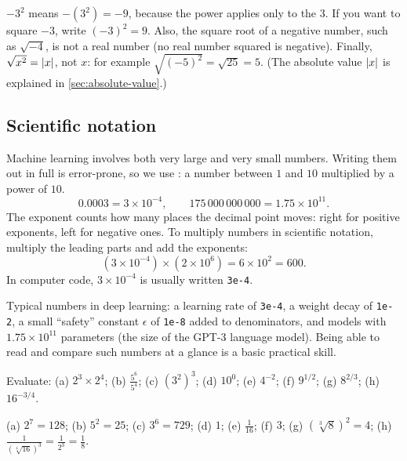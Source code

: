 \begin{pitfall}
$-3^2$ means $-(3^2) = -9$, because the power applies only to the $3$. If you
want to square $-3$, write $(-3)^2 = 9$. Also, the square root of a negative
number, such as $\sqrt{-4}$, is not a real number (no real number squared is
negative). Finally, $\sqrt{x^2} = \lvert x\rvert$, not $x$: for example
$\sqrt{(-5)^2} = \sqrt{25} = 5$. (The absolute value $\lvert x\rvert$ is explained in
\cref{sec:absolute-value}.)
\end{pitfall}

\subsection{Scientific notation}

Machine learning involves both very large and very small numbers. Writing them
out in full is error-prone, so we use : a number
between $1$ and $10$ multiplied by a power of $10$.
\[
  0.0003 = 3 \times 10^{-4}, \qquad
  175\,000\,000\,000 = 1.75 \times 10^{11}.
\]
The exponent counts how many places the decimal point moves: right for
positive exponents, left for negative ones. To multiply numbers in scientific
notation, multiply the leading parts and add the exponents:
\[
  (3 \times 10^{-4}) \times (2 \times 10^{6}) = 6 \times 10^{2} = 600 .
\]
In computer code, $3 \times 10^{-4}$ is usually written \texttt{3e-4}.

\begin{mlnote}
Typical numbers in deep learning: a learning rate of \texttt{3e-4}, a weight
decay of \texttt{1e-2}, a small ``safety'' constant $\epsilon$ of \texttt{1e-8}
added to denominators, and models with $1.75\times10^{11}$ parameters (the
size of the GPT-3 language model). Being able to read and compare such numbers
at a glance is a basic practical skill.
\end{mlnote}

\sectionexercises

\begin{exercise}
Evaluate: (a) $2^3\times2^4$; (b) $\tfrac{5^6}{5^4}$; (c) $(3^2)^3$;
(d) $10^0$; (e) $4^{-2}$; (f) $9^{1/2}$; (g) $8^{2/3}$; (h) $16^{-3/4}$.
\end{exercise}
\begin{solution}
(a) $2^7 = 128$; (b) $5^2 = 25$; (c) $3^6 = 729$; (d) $1$; (e)
$\tfrac{1}{16}$; (f) $3$; (g) $(\sqrt[3]8)^2 = 4$; (h)
$\tfrac{1}{(\sqrt[4]{16})^3} = \tfrac{1}{2^3} = \tfrac18$.
\end{solution}

